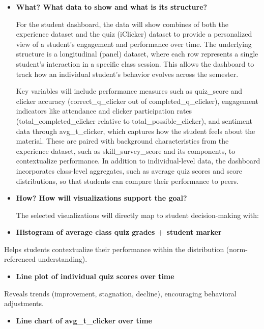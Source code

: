 \documentclass[
]{article}
\providecommand{\tightlist}{%
  \setlength{\itemsep}{0pt}\setlength{\parskip}{0pt}}
\begin{document}
\begin{itemize}
\item
  \textbf{What? What data to show and what is its structure?}

  For the student dashboard, the data will show combines of both the
  experience dataset and the quiz (iClicker) dataset to provide a
  personalized view of a student's engagement and performance over time.
  The underlying structure is a longitudinal (panel) dataset, where each
  row represents a single student's interaction in a specific class
  session. This allows the dashboard to track how an individual
  student's behavior evolves across the semester.

  Key variables will include performance measures such as quiz\_score
  and clicker accuracy (correct\_q\_clicker out of
  completed\_q\_clicker), engagement indicators like attendance and
  clicker participation rates (total\_completed\_clicker relative to
  total\_possible\_clicker), and sentiment data through avg\_t\_clicker,
  which captures how the student feels about the material. These are
  paired with background characteristics from the experience dataset,
  such as skill\_survey\_score and its components, to contextualize
  performance. In addition to individual-level data, the dashboard
  incorporates class-level aggregates, such as average quiz scores and
  score distributions, so that students can compare their performance to
  peers.
\item
  \textbf{How? How will visualizations support the goal?}

  The selected visualizations will directly map to student
  decision-making with:
\item
  \textbf{Histogram of average class quiz grades + student marker}
\end{itemize}

Helps students contextualize their performance within the distribution
(norm-referenced understanding).

\begin{itemize}
\tightlist
\item
  \textbf{Line plot of individual quiz scores over time}
\end{itemize}

Reveals trends (improvement, stagnation, decline), encouraging
behavioral adjustments.

\begin{itemize}
\tightlist
\item
  \textbf{Line chart of avg\_t\_clicker over time}
\end{itemize}
\end{document}
